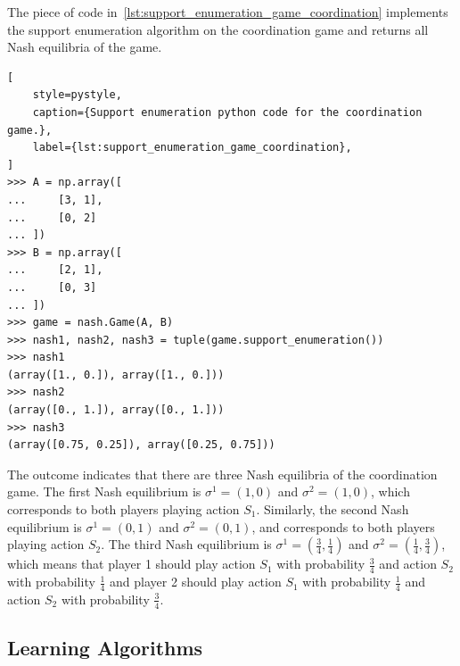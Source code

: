 The piece of code in~\ref{lst:support_enumeration_game_coordination} implements
the support enumeration algorithm on the
coordination game and returns all Nash equilibria of the game.

\begin{lstlisting}[
    style=pystyle,
    caption={Support enumeration python code for the coordination game.},
    label={lst:support_enumeration_game_coordination},
]
>>> A = np.array([
...     [3, 1],
...     [0, 2]
... ])
>>> B = np.array([
...     [2, 1],
...     [0, 3]
... ])
>>> game = nash.Game(A, B)
>>> nash1, nash2, nash3 = tuple(game.support_enumeration())
>>> nash1
(array([1., 0.]), array([1., 0.]))
>>> nash2
(array([0., 1.]), array([0., 1.]))
>>> nash3
(array([0.75, 0.25]), array([0.25, 0.75]))

\end{lstlisting}

The outcome indicates that there are three Nash equilibria of the coordination
game.
The first Nash equilibrium is \(\sigma^1 = (1, 0)\) and \(\sigma^2 = (1, 0)\),
which corresponds to both players playing action \(S_1\).
Similarly, the second Nash equilibrium is \(\sigma^1 = (0, 1)\) and
\(\sigma^2 = (0, 1)\), and corresponds to both players playing action \(S_2\).
The third Nash equilibrium is \(\sigma^1 = (\frac{3}{4}, \frac{1}{4})\) and
\(\sigma^2 = (\frac{1}{4}, \frac{3}{4})\), which means that player 1 should
play action \(S_1\) with probability \(\frac{3}{4}\) and action \(S_2\) with
probability \(\frac{1}{4}\) and player 2 should play action \(S_1\) with
probability \(\frac{1}{4}\) and action \(S_2\) with probability
\(\frac{3}{4}\).


\subsection{Learning Algorithms}\label{sec:game_intro_learning_algorithms}

